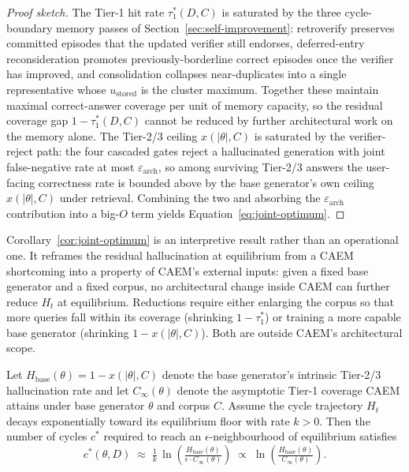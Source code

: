 \begin{proof}[Proof sketch]
The Tier-1 hit rate $\tau_{1}^{*}(D, C)$ is saturated by the three cycle-boundary memory passes of Section~\ref{sec:self-improvement}: retroverify preserves committed episodes that the updated verifier still endorses, deferred-entry reconsideration promotes previously-borderline correct episodes once the verifier has improved, and consolidation collapses near-duplicates into a single representative whose $u_{\text{stored}}$ is the cluster maximum. Together these maintain maximal correct-answer coverage per unit of memory capacity, so the residual coverage gap $1 - \tau_{1}^{*}(D, C)$ cannot be reduced by further architectural work on the memory alone. The Tier-2/3 ceiling $x(|\theta|, C)$ is saturated by the verifier-reject path: the four cascaded gates reject a hallucinated generation with joint false-negative rate at most $\varepsilon_{\text{arch}}$, so among surviving Tier-2/3 answers the user-facing correctness rate is bounded above by the base generator's own ceiling $x(|\theta|, C)$ under retrieval. Combining the two and absorbing the $\varepsilon_{\text{arch}}$ contribution into a big-$O$ term yields Equation~\ref{eq:joint-optimum}.
\end{proof}

Corollary~\ref{cor:joint-optimum} is an interpretive result rather than an operational one. It reframes the residual hallucination at equilibrium from a CAEM shortcoming into a property of CAEM's external inputs: given a fixed base generator and a fixed corpus, no architectural change inside CAEM can further reduce $H_{t}$ at equilibrium. Reductions require either enlarging the corpus so that more queries fall within its coverage (shrinking $1 - \tau_{1}^{*}$) or training a more capable base generator (shrinking $1 - x(|\theta|, C)$). Both are outside CAEM's architectural scope.

\begin{corollary}
\label{cor:base-conditional-rate}
Let $H_{\text{base}}(\theta) = 1 - x(|\theta|, C)$ denote the base generator's intrinsic Tier-2/3 hallucination rate and let $C_{\infty}(\theta)$ denote the asymptotic Tier-1 coverage CAEM attains under base generator $\theta$ and corpus $C$. Assume the cycle trajectory $H_{t}$ decays exponentially toward its equilibrium floor with rate $k > 0$. Then the number of cycles $c^{*}$ required to reach an $\epsilon$-neighbourhood of equilibrium satisfies
\begin{equation}
c^{*}(\theta, D) \;\approx\; \tfrac{1}{k} \,\ln\!\left(\tfrac{H_{\text{base}}(\theta)}{\epsilon \cdot C_{\infty}(\theta)}\right)
\;\propto\; \ln\!\left(\tfrac{H_{\text{base}}(\theta)}{C_{\infty}(\theta)}\right).
\label{eq:convergence-rate}
\end{equation}
\end{corollary}

